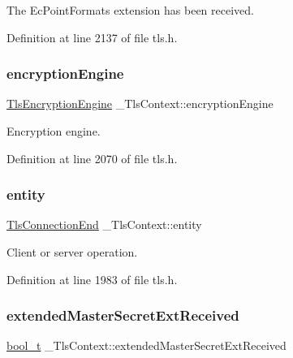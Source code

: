 The Ec\+Point\+Formats extension has been received. 



Definition at line 2137 of file tls.\+h.

\mbox{\label{struct__TlsContext_af88a47a7dbd14e4ca3abd6486b4eaf7d}} 
\subsubsection{\texorpdfstring{encryption\+Engine}{encryptionEngine}}
{\footnotesize\ttfamily \hyperlink{structTlsEncryptionEngine}{Tls\+Encryption\+Engine} \+\_\+\+Tls\+Context\+::encryption\+Engine}



Encryption engine. 



Definition at line 2070 of file tls.\+h.

\mbox{\label{struct__TlsContext_a9cb3b22d9fe0de7314d33ca6caba5d42}} 
\subsubsection{\texorpdfstring{entity}{entity}}
{\footnotesize\ttfamily \hyperlink{tls_8h_acb21bc158664d823d899d760edd8135b}{Tls\+Connection\+End} \+\_\+\+Tls\+Context\+::entity}



Client or server operation. 



Definition at line 1983 of file tls.\+h.

\mbox{\label{struct__TlsContext_a185160342c5f985fe428d1712baa40f1}} 
\subsubsection{\texorpdfstring{extended\+Master\+Secret\+Ext\+Received}{extendedMasterSecretExtReceived}}
{\footnotesize\ttfamily \hyperlink{compiler__port_8h_a812d16e5494522586b3784e55d479912}{bool\+\_\+t} \+\_\+\+Tls\+Context\+::extended\+Master\+Secret\+Ext\+Received}



